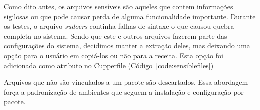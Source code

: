 Como dito antes, os arquivos sensíveis são aqueles que contem
informações sigilosas ou que pode causar perda de alguma funcionalidade importante.
Durante os testes, o arquivo \textit{sudoers} continha falhas de sintaxe o que causou
quebra completa no sistema. Sendo que este e outros arquivos fazerem parte das
configurações do sistema, decidimos manter a extração deles, mas deixando uma opção
para o usuário em copiá-los ou não para a receita. Esta opção foi adicionada como
atributo no Cupperfile (Código~\ref{code:sensiblefiles})

\noindent\begin{minipage}{\textwidth}
  \lstset{style=shell}
  
\end{minipage}\hfill

Arquivos que não são vinculados a um pacote são descartados. Essa abordagem força
a padronização de ambientes que seguem a instalação e configuração por pacote.
